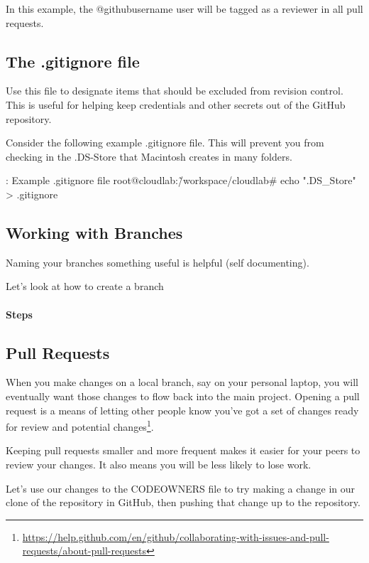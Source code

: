 In this example, the @githubusername user will be tagged as a reviewer
in all pull requests.


\subsection{The .gitignore file}
\justify
Use this file to designate items that should be excluded from revision
control. This is useful for helping keep credentials and other secrets
out of the GitHub repository.

\justify
Consider the following example .gitignore file. This will prevent you
from checking in the .DS-Store that Macintosh creates in many folders.

\begin{mybox}{\thetcbcounter: Example .gitignore file}
  root@cloudlab:\~/workspace/cloudlab\# echo ".DS\_Store" > .gitignore
\end{mybox}

\subsection{Working with Branches}

Naming your branches something useful is helpful (self documenting).

Let's look at how to create a branch

\hypertarget{steps-3}{%
  \paragraph{Steps}\label{steps-3}}


\subsection{Pull Requests}

\justify
When you make changes on a local branch, say on your personal laptop,
you will eventually want those changes to flow back into the main
project. Opening a pull request is a means of letting other people know
you've got a set of changes ready for review and potential
changes\footnote{\url{https://help.github.com/en/github/collaborating-with-issues-and-pull-requests/about-pull-requests}}.

\justify
Keeping pull requests smaller and more frequent makes it easier for your
peers to review your changes. It also means you will be less likely to
lose work.

\justify
Let's use our changes to the CODEOWNERS file to try making a change in
our clone of the repository in GitHub, then pushing that change up to
the repository.

